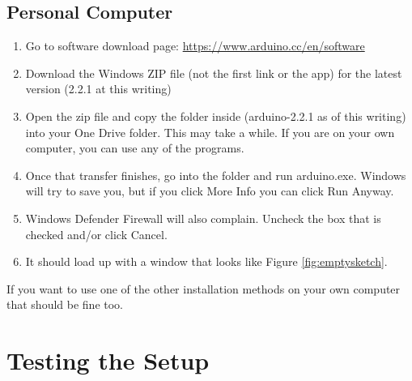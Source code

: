 \subsection{Personal Computer}
\begin{enumerate}
	\item Go to software download page: \href{https://www.arduino.cc/en/software}{https://www.arduino.cc/en/software}
	\item Download the Windows ZIP file (not the first link or the app) for the latest version (2.2.1 at this writing)
	\item Open the zip file and copy the folder inside (arduino-2.2.1 as of this writing) into your One Drive folder. This may take a while. If you are on your own computer, you can use any of the programs.
	\item Once that transfer finishes, go into the folder and run arduino.exe. Windows will try to save you, but if you click More Info you can click Run Anyway.
	\item Windows Defender Firewall will also complain. Uncheck the box that is checked and/or click Cancel.
	\item It should load up with a window that looks like Figure \ref{fig:emptysketch}.
\end{enumerate}
If you want to use one of the other installation methods on your own computer that should be fine too.

\section{Testing the Setup}
